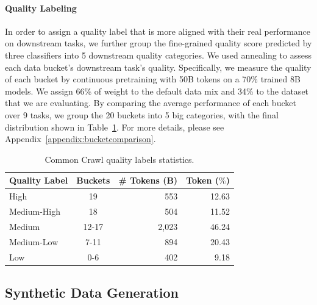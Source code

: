 \documentclass[11pt]{article}
\begin{document}
\paragraph{Quality Labeling}
In order to assign a quality label that is more aligned with their real performance on downstream tasks, we further group the fine-grained quality score predicted by three classifiers into 5 downstream quality categories. We used annealing to assess each data bucket's downstream task's quality. Specifically, we measure the quality of each bucket by continuous pretraining with 50B tokens on a 70\% trained 8B models. We assign 66\% of weight to the default data mix and 34\% to the dataset that we are evaluating. By comparing the average performance of each bucket over 9 tasks, we group the 20 buckets into 5 big categories, with the final distribution shown in Table~\ref{table:quality_label_stats}. For more details, please see Appendix~\ref{appendix:bucketcomparison}.

\begin{table}[htbp]\centering\small
\begin{tabularx}{\linewidth}{Xcrr}
\toprule
\textbf{Quality Label} & \multicolumn{1}{l}{\textbf{Buckets}} & \multicolumn{1}{l}{\textbf{\# Tokens (B)}} & \multicolumn{1}{l}{\textbf{Token ($\%$)}} \\ \midrule
High                   & 19                                   & 553                                        & 12.63                                     \\
Medium-High            & 18                                   & 504                                        & 11.52                                     \\
Medium                 & 12-17                                & 2,023                                      & 46.24                                     \\
Medium-Low             & 7-11                                 & 894                                        & 20.43                                     \\
Low                    & 0-6                                  & 402                                        & 9.18                                      \\ \bottomrule
\end{tabularx}
\caption{Common Crawl quality labels statistics.}
\label{table:quality_label_stats}
\end{table}

\subsection{Synthetic Data Generation} \label{sec:synthetic}
\end{document}
